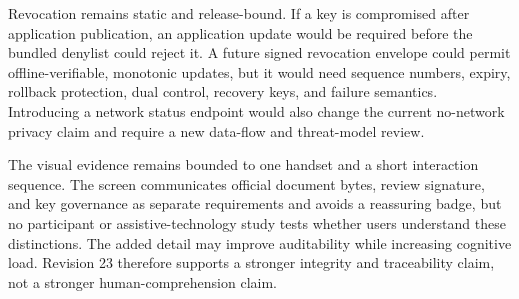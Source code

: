 Revocation remains static and release-bound. If a key is compromised after application publication, an application update would be required before the bundled denylist could reject it. A future signed revocation envelope could permit offline-verifiable, monotonic updates, but it would need sequence numbers, expiry, rollback protection, dual control, recovery keys, and failure semantics. Introducing a network status endpoint would also change the current no-network privacy claim and require a new data-flow and threat-model review.

The visual evidence remains bounded to one handset and a short interaction sequence. The screen communicates official document bytes, review signature, and key governance as separate requirements and avoids a reassuring badge, but no participant or assistive-technology study tests whether users understand these distinctions. The added detail may improve auditability while increasing cognitive load. Revision 23 therefore supports a stronger integrity and traceability claim, not a stronger human-comprehension claim.
